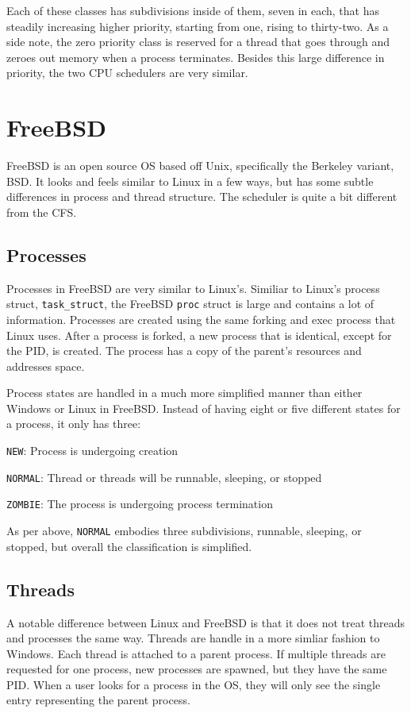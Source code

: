   Each of these classes has subdivisions inside of them, seven in each, that
  has steadily increasing higher priority, starting from one, rising to thirty-two.
  As a side note, the zero priority class is reserved for a thread that goes through
  and zeroes out memory when a process terminates.\cite{msschedule2016} Besides
  this large difference in priority, the two CPU schedulers are very similar.

\section{FreeBSD}
FreeBSD is an open source OS based off Unix, specifically the Berkeley variant,
BSD. It looks and feels similar to Linux in a few ways, but has some subtle
differences in process and thread structure. The scheduler is quite a bit different
from the CFS.
  \subsection{Processes}
Processes in FreeBSD are very similar to Linux's. Similiar to Linux's process
struct, \texttt{task\_struct}, the FreeBSD \texttt{proc} struct is large and
contains a lot of information. Processes are created using the same forking and
exec process that Linux uses. After a process is forked, a new process that is
identical, except for the PID, is created. The process has a copy of the parent's
resources and addresses space.

Process states are handled in a much more simplified manner than either Windows
or Linux in FreeBSD. Instead of having eight or five different states for a process,
it only has three:
\begin{description}
  \item \texttt{NEW}: Process is undergoing creation
  \item \texttt{NORMAL}: Thread or threads will be runnable, sleeping, or stopped
  \item \texttt{ZOMBIE}: The process is undergoing process termination
\end{description}

As per above, \texttt{NORMAL} embodies three subdivisions, runnable, sleeping,
or stopped, but overall the classification is simplified. \cite{kirkgeorgebsd}

  \subsection{Threads}
A notable difference between Linux and FreeBSD is that it does not treat threads
and processes the same way. Threads are handle in a more simliar fashion to Windows.
Each thread is attached to a parent process. If multiple threads are requested
for one process, new processes are spawned, but they have the same PID. When a
user looks for a process in the OS, they will only see the single entry representing
the parent process.

